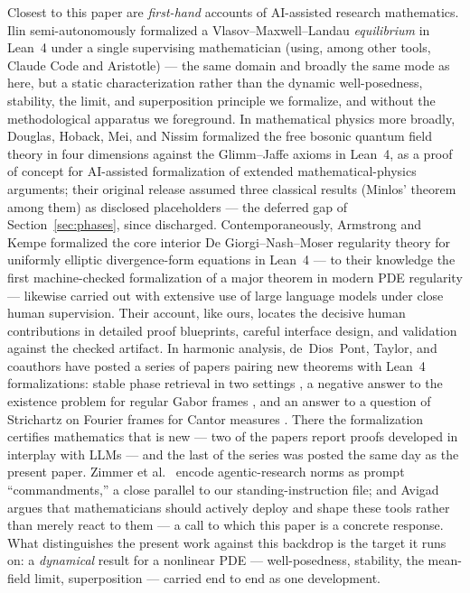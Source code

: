 \documentclass[11pt]{article}
\theoremstyle{plain}
\theoremstyle{definition}
\theoremstyle{remark}
\begin{document}
Closest to this paper are \emph{first-hand} accounts of AI-assisted
research mathematics. Ilin \cite{IlinVML} semi-autonomously formalized a
Vlasov--Maxwell--Landau \emph{equilibrium} in Lean~4 under a single supervising
mathematician (using, among other tools, Claude Code and Aristotle) --- the same
domain and broadly the same mode as here, but a static characterization rather
than the dynamic well-posedness, stability, the limit, and
superposition principle \cite{AGS} we formalize, and without the methodological
apparatus we foreground. In mathematical physics more broadly, Douglas, Hoback,
Mei, and Nissim \cite{QFTFormalization} formalized the free bosonic quantum field
theory in four dimensions against the Glimm--Jaffe axioms in Lean~4, as a proof of
concept for AI-assisted formalization of extended mathematical-physics arguments;
their original release assumed three classical results (Minlos' theorem among
them) as disclosed placeholders --- the deferred gap of Section~\ref{sec:phases},
since discharged. Contemporaneously, Armstrong and Kempe \cite{DGNM}
formalized the core interior De Giorgi--Nash--Moser regularity theory for
uniformly elliptic divergence-form equations in Lean~4 --- to their knowledge the
first machine-checked formalization of a major theorem in modern PDE regularity ---
likewise carried out with extensive use of large language models under close
human supervision. Their account, like ours, locates the decisive human
contributions in detailed proof blueprints, careful interface design, and
validation against the checked artifact.
In harmonic analysis, de~Dios~Pont, Taylor, and coauthors have posted a series
of papers pairing new theorems with Lean~4 formalizations: stable phase
retrieval in two settings \cite{STFTPhaseRetrieval,PhaseRetrievalSpans}, a
negative answer to the existence problem for regular Gabor frames
\cite{GaborFrames}, and an answer to a question of Strichartz on Fourier frames
for Cantor measures \cite{CantorFourierFrames}. There the formalization
certifies mathematics that is new --- two of the papers
\cite{STFTPhaseRetrieval,PhaseRetrievalSpans} report proofs developed in
interplay with LLMs --- and the last of the series was posted the same day as
the present paper.
Zimmer et al.\ \cite{AgenticResearcher} encode agentic-research norms as prompt
``commandments,'' a close parallel to our standing-instruction file; and Avigad
\cite{Avigad} argues that mathematicians should actively deploy
and shape these tools rather than merely react to them --- a call to which this
paper is a concrete response. What distinguishes the present work against this
backdrop is the target it runs on: a \emph{dynamical} result for a nonlinear
PDE --- well-posedness, stability, the mean-field limit, superposition ---
carried end to end as one development.
\end{document}
